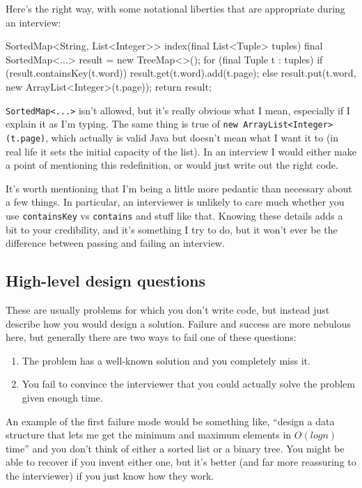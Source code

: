 \documentclass{article}
\begin{document}
      Here's the right way, with some notational liberties that are appropriate
      during an interview:

\begin{javacode}
SortedMap<String, List<Integer>> index(final List<Tuple> tuples) {
  final SortedMap<...> result = new TreeMap<>();
  for (final Tuple t : tuples) {
    if (result.containsKey(t.word))
      result.get(t.word).add(t.page);
    else
      result.put(t.word, new ArrayList<Integer>(t.page));
  }
  return result;
} \end{javacode}

      \verb|SortedMap<...>| isn't allowed, but it's really obvious what I mean,
      especially if I explain it as I'm typing. The same thing is true of
      \verb|new ArrayList<Integer>(t.page)|, which actually is valid Java but
      doesn't mean what I want it to (in real life it sets the initial capacity
      of the list). In an interview I would either make a point of mentioning
      this redefinition, or would just write out the right code.

      It's worth mentioning that I'm being a little more pedantic than
      necessary about a few things. In particular, an interviewer is unlikely
      to care much whether you use {\tt containsKey} vs {\tt contains} and
      stuff like that. Knowing these details adds a bit to your credibility,
      and it's something I try to do, but it won't ever be the difference
      between passing and failing an interview.

\subsection{High-level design questions}
    These are usually problems for which you don't write code, but instead just
    describe how you would design a solution. Failure and success are more
    nebulous here, but generally there are two ways to fail one of these
    questions:

\begin{enumerate}
\item{The problem has a well-known solution and you completely miss it.}
\item{You fail to convince the interviewer that you could actually solve}
  the problem given enough time.
\end{enumerate}

    An example of the first failure mode would be something like, ``design a
    data structure that lets me get the minimum and maximum elements in $O(log
    n)$ time'' and you don't think of either a sorted list or a binary tree.
    You might be able to recover if you invent either one, but it's better (and
    far more reassuring to the interviewer) if you just know how they work.
\end{document}
